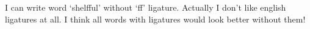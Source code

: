 I can write word `shelf{}ful' without `ff' ligature.
Actually I don't like english ligatures at all.
I think all words with ligatures would look better without them!
\bye
